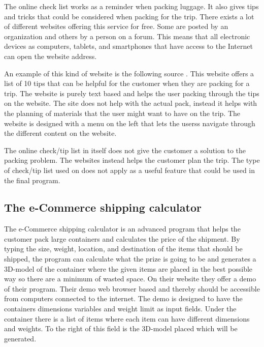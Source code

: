 The online check list works as a reminder when packing luggage. It also gives tips and tricks that could be considered when packing for the trip. There exists a lot of different websites offering this service for free. Some are posted by an organization and others by a person on a forum. This means that all electronic devices as computers, tablets, and smartphones that have access to the Internet can open the website address.

An example of this kind of website is the following source \citep{onlinecheck}. This website offers a list of 10 tips that can be helpful for the customer when they are packing for a trip. The website is purely text based and helps the user packing through the tips on the website.
The site does not help with the actual pack, instead it helps with the planning of materials that the user might want to have on the trip.
The website is designed with a menu on the left that lets the userss navigate through the different content on the website.

The online check/tip list in itself does not give the customer a solution to the packing problem. The websites instead helps the customer plan the trip. The type of check/tip list used on \citep{onlinecheck} does not apply as a useful feature that could be used in the final program. %

\subsection{The e-Commerce shipping calculator}

The e-Commerce shipping calculator is an advanced program that helps the customer pack large containers and calculates the price of the shipment.
By typing the size, weight, location, and destination of the items that should be shipped, the program can calculate what the prize is going to be and generates a 3D-model of the container where the given items are placed in the best possible way so there are a minimum of wasted space. On their website \citep{solvingmaze} they offer a demo of their program. Their demo web browser based and thereby should be accessible from computers connected to the internet.
The demo is designed to have the containers dimensions variables and weight limit as input fields. Under the container there is a list of items where each item can have different dimensions and weights. To the right of this field is the 3D-model placed which will be generated.

